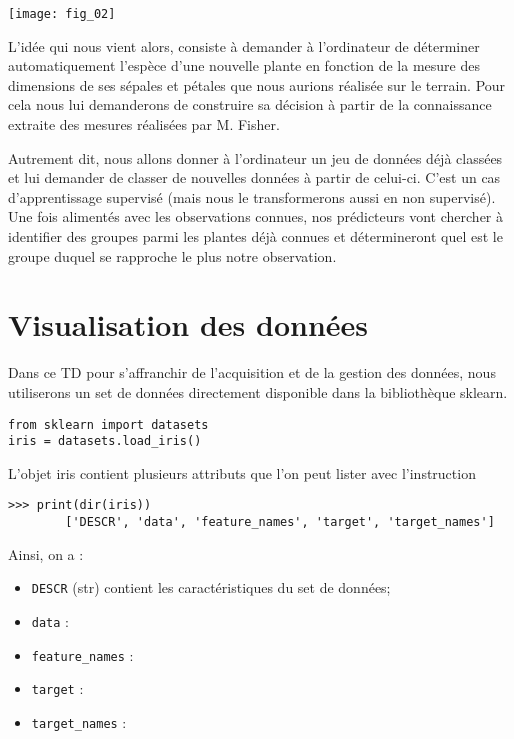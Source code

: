 \begin{center}
\texttt{[image: fig\_02]}
\end{center}

L'idée qui nous vient alors, consiste à demander à l'ordinateur de déterminer automatiquement l'espèce d'une nouvelle plante en fonction de la mesure des dimensions de ses sépales et pétales que nous aurions réalisée sur le terrain. Pour cela nous lui demanderons de construire sa décision à partir de la connaissance extraite des mesures réalisées par M. Fisher.

Autrement dit, nous allons donner à l'ordinateur un jeu de données déjà classées et lui demander de classer de nouvelles données à partir de celui-ci. C'est un cas d'apprentissage supervisé (mais nous le transformerons aussi en non supervisé).
Une fois alimentés avec les observations connues, nos prédicteurs vont chercher à identifier des groupes parmi les plantes déjà connues et détermineront quel est le groupe duquel se rapproche le plus notre observation.


\section{Visualisation des données}
Dans ce TD pour s'affranchir de l'acquisition et de la gestion des données, nous utiliserons un set de données directement disponible dans la bibliothèque sklearn.

\begin{verbatim}
from sklearn import datasets
iris = datasets.load_iris()
\end{verbatim}

L'objet iris contient plusieurs attributs que l'on peut lister avec l'instruction 

\begin{verbatim}
>>> print(dir(iris))
        ['DESCR', 'data', 'feature_names', 'target', 'target_names']
\end{verbatim}

Ainsi, on a :
\begin{itemize}
\item \texttt{DESCR} (str) contient les caractéristiques du set de données;
\item \texttt{data} :
\item \texttt{feature\_names} :
\item \texttt{target} :
\item \texttt{target\_names} :
\end{itemize}